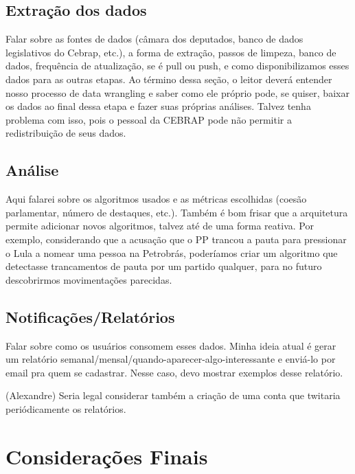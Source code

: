 \documentclass[a4paper,titlepage]{ppgi}\usepackage[]{graphicx}\usepackage[]{color}
\begin{document}
\subsection{Extração dos dados}

Falar sobre as fontes de dados (câmara dos deputados, banco de dados legislativos do Cebrap, etc.), a forma de extração, passos de limpeza, banco de dados, frequência de atualização, se é pull ou push, e como disponibilizamos esses dados para as outras etapas. Ao término dessa seção, o leitor deverá entender nosso processo de data wrangling e saber como ele próprio pode, se quiser, baixar os dados ao final dessa etapa e fazer suas próprias análises. Talvez tenha problema com isso, pois o pessoal da CEBRAP pode não permitir a redistribuição de seus dados.



\subsection{Análise}

Aqui falarei sobre os algoritmos usados e as métricas escolhidas (coesão parlamentar, número de destaques, etc.). Também é bom frisar que a arquitetura permite adicionar novos algoritmos, talvez até de uma forma reativa. Por exemplo, considerando que a acusação que o PP trancou a pauta para pressionar o Lula a nomear uma pessoa na Petrobrás, poderíamos criar um algoritmo que detectasse trancamentos de pauta por um partido qualquer, para no futuro descobrirmos movimentações parecidas.

\subsection{Notificações/Relatórios}

Falar sobre como os usuários consomem esses dados. Minha ideia atual é gerar um relatório semanal/mensal/quando-aparecer-algo-interessante e enviá-lo por email pra quem se cadastrar. Nesse caso, devo mostrar exemplos desse relatório.


(Alexandre) Seria legal considerar também a criação de uma conta que twitaria periódicamente os relatórios.


\section{Considerações Finais}
\end{document}
